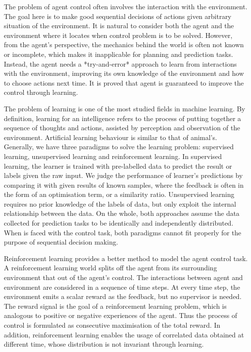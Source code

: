 \documentclass[twoside,12pt,a4paper]{article}
\begin{document}
The problem of agent control often involves the interaction with the environment. The goal here is to make good sequential decisions of actions given arbitrary situation of the environment. It is natural to consider both the agent and the environment where it locates when control problem is to be solved. However, from the agent's perspective, the mechanics behind the world is often not known or incomplete, which makes it inapplicable for planning and prediction tasks. Instead, the agent needs a *try-and-error* approach to learn from interactions with the environment, improving its own knowledge of the environment and how to choose actions next time. It is proved that agent is guaranteed to improve the control through learning.

The problem of learning is one of the most studied fields in machine learning. By definition, learning for an intelligence refers to the process of putting together a sequence of thoughts and actions, assisted by perception and observation of the environment. Artificial learning behaviour is similar to that of animal's. Generally, we have three paradigms to solve the learning problem: supervised learning, unsupervised learning and reinforcement learning. In supervised learning, the learner is trained with pre-labelled data to predict the result or labels given the raw input. We judge the performance of learner's predictions by comparing it with given results of known samples, where the feedback is often in the form of an optimisation term, or a similarity ratio. Unsupervised learning requires no prior knowledge of the labels of data, but only exploit the internal relationship between the data. On the whole, both approaches assume the data collected for prediction tasks to be identically and independently distributed. When is faced with the control task, both paradigms cannot fit properly for the purpose of sequential decision making.

Reinforcement learning provides a better method to model the agent control task. A reinforcement learning world splits off the agent from its surrounding environment that out of the agent's control. The interactions between agent and environment are considered in a sequence of time steps. At every time step, the environment emits a scalar reward as the feedback, but no supervisor is needed. The reward signal is the goal of a reinforcement learning problem, which is analogous to positive or negative experiences of the agent. Thus the process of control is formulated as consecutive maximisation of the total reward. In addition, reinforcement learning enables the usage of correlated data obtained at different time, whose distribution is not invariant through learning.
\end{document}
